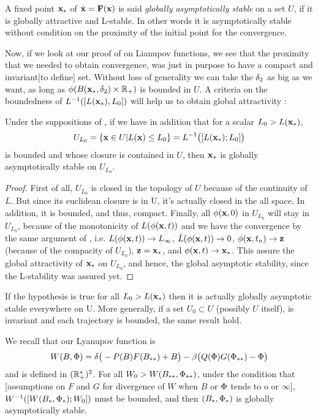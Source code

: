 \begin{definition}
    A fixed point $\xx_*$ of $\bdotx=\mathbf{F}(\mathbf{x})$ is said \emph{globally asymptotically stable} on a set $U$, if it is globally attractive and L-stable. In other words it is asymptotically stable without condition on the proximity of the initial point for the convergence.
\end{definition}
Now, if we look at our proof of  on Lianupov functions, we see that the proximity that we needed to obtain convergence, was just in purpose to have a compact and invariant[to define] set. Without loss of generality we can take the $\d_2$ as big as we want, as long as $\phi(B(\xx_*,\d_2)\times\R_+)$ is bounded in $U$. A criteria on the boundedness of $L^{-1}([L(\xx_*),L_0])$ will help us to obtain global attractivity :
\begin{theoreme}
Under the suppositions of , if we have in addition that for a scalar $L_0>L(\xx_*)$,
\[ U_{L_0} = \{ \xx\in U | L(\xx) \leq L_0\} = L^{-1}\big([L(\xx_*);L_0]\big) \]
is bounded and whose closure is contained in $U$, then $\xx_*$ is globally asymptotically stable on $U_{L_0}$.
\end{theoreme}
\begin{proof}
First of all, $U_{L_0}$ is closed in the topology of $U$ because of the continuity of $L$. But since its euclidean closure is in U, it's actually closed in the all space. In addition, it is bounded, and thus, compact. Finally, all $\phi(\xx,0)$ in $U_{L_0}$ will stay in $U_{L_0}$, because of the monotonicity of $L(\phi(\xx,t))$ and we have the convergence by the same argument of , i.e. $L(\phi(\xx,t))\to L_\infty$, $\dot{L}(\phi(\xx,t))\to 0$, $\phi(\xx,t_n)\to \zz$ (because of the compacity of $U_{L_0}$), $\zz=\xx_*$, and $\phi(\xx,t)\to \xx_*$. This assure the global attractivity of $\xx_*$ on $U_{L_0}$, and hence, the global asymptotic stability, since the L-stability was assured yet.
\end{proof}

\begin{remarque}
If the hypothesis is true for all $L_0>L(\xx_*)$ then it is actually globally asymptotic stable everywhere on U. More generally, if a set $U_0\subset U$ (possibly $U$ itself), is invariant and each trajectory is bounded, the same result hold.
\end{remarque}
We recall that our Lyanupov function is 
\[W(B,\P) = \d \big(-P(B)F(\Bstar) + B\big) 
-\b\big(Q(\P) G(\Pstar)-\P\big)\]
and is defined in $(\R^*_+)^2$. For all $W_0>W(\Bstar,\Pstar)$, under the condition that [assumptions on $F$ and $G$ for divergence of $W$ when $B$ or $\P$ tends to o or $\infty$], $W^{-1}([W(B_*,\P_*);W_0])$ must be bounded, and then $(B_*,\P_*)$ is globally asymptotically stable. 
